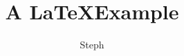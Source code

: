\documentclass{article}
\begin{document}
\title{A \LaTeX Example}
\author{Steph}
\maketitle

\section{}
\end{document}

